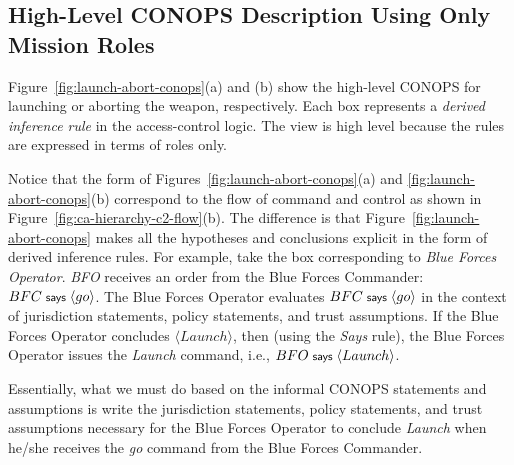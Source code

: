 \documentclass[10pt,twoside]{article}
\newcommand{\action}[1]{\ensuremath{\langle #1 \rangle}}
\begin{document}
\subsection{High-Level CONOPS Description Using Only Mission Roles}
\label{sec:high-level-conops}

Figure~\ref{fig:launch-abort-conops}(a) and (b) show the high-level
CONOPS for launching or aborting the weapon, respectively. Each box
represents a \emph{derived inference rule} in the access-control
logic. The view is high level because the rules are expressed in terms
of roles only.

Notice that the form of Figures~\ref{fig:launch-abort-conops}(a) and
\ref{fig:launch-abort-conops}(b) correspond to the flow of command and
control as shown in Figure~\ref{fig:ca-hierarchy-c2-flow}(b). The
difference is that Figure~\ref{fig:launch-abort-conops} makes all the
hypotheses and conclusions explicit in the form of derived inference
rules. For example, take the box corresponding to \emph{Blue Forces
  Operator}.  \emph{BFO} receives an order from the Blue Forces
Commander: $BFC \says \action{go}$. The Blue Forces Operator evaluates
$BFC \says \action{go}$ in the context of jurisdiction statements,
policy statements, and trust assumptions.  If the Blue Forces Operator
concludes \action{Launch}, then (using the \emph{Says} rule), the Blue
Forces Operator issues the \emph{Launch} command, i.e., $BFO \says
\action{Launch}$.

Essentially, what we must do based on the informal CONOPS statements
and assumptions is write the jurisdiction statements, policy
statements, and trust assumptions necessary for the Blue Forces
Operator to conclude \emph{Launch} when he/she receives the \emph{go}
command from the Blue Forces Commander. 
\end{document}
